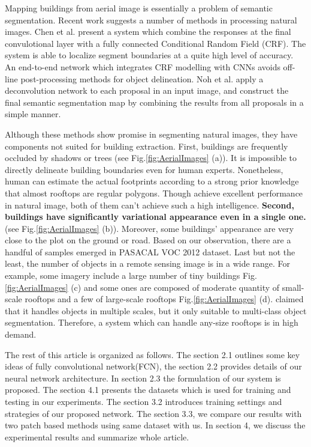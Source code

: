 \documentclass[runningheads]{llncs}
\begin{document}
   Mapping buildings from aerial image is essentially a problem of semantic segmentation. Recent work suggests a number of methods in processing natural images.  Chen et al. \cite{chen14semantic} present a system which combine the responses at the final convulotional layer with a fully connected Conditional Random Field (CRF). The system is able to localize segment boundaries at a quite high level of accuracy. An end-to-end network  \cite{Zheng2015Conditional}  which integrates CRF modelling with CNNs avoids off-line post-processing methods for object delineation. Noh et al. \cite{Noh2015Learning} apply a deconvolution network to each proposal in an input image, and construct the final semantic segmentation map by combining the results from all proposals in a simple manner.
     
    Although these methods show promise in segmenting natural images, they have components not suited for building extraction. First, buildings are frequently occluded by shadows or trees (see Fig.\ref{fig:AerialImages} (a)). It is impossible to directly delineate building boundaries even for human experts. Nonetheless, human can estimate the actual footprints according to a strong prior knowledge that almost rooftops are regular polygons. Though \cite{chen14semantic} \cite{Zheng2015Conditional} achieve excellent performance in natural image, both of them can't achieve such a high intelligence.\textbf{ Second, buildings have significantly variational appearance even in a single one.} (see Fig.\ref{fig:AerialImages} (b)). Moreover, some buildings' appearance are very close to the plot on the ground or road. Based on our observation, there are a handful of samples emerged in PASACAL VOC 2012 dataset. Last but not the least, the number of objects in a remote sensing image is in a wide range. For example, some imagery  include a large number of tiny buildings Fig.\ref{fig:AerialImages} (c) and some ones are composed of moderate quantity of small-scale rooftops and a few of large-scale rooftops Fig.\ref{fig:AerialImages} (d). \cite{Noh2015Learning} claimed that it handles objects in multiple scales, but it only suitable to multi-class object segmentation. Therefore, a system which can handle any-size rooftops is in high demand. 
  
   The rest of this article is organized as follows. The section 2.1 outlines some key ideas of fully convolutional network(FCN), the section 2.2 provides details of our neural network architecture. In section 2.3 the formulation of our system is proposed. The section 4.1 presents the datasets which is used for training and testing in our experiments. The section 3.2  introduces training settings and strategies of our proposed network.  The section 3.3, we compare our results with two patch based methods using same dataset with us. In section 4, we discuss the experimental results and summarize whole article. 
	
\end{document}
